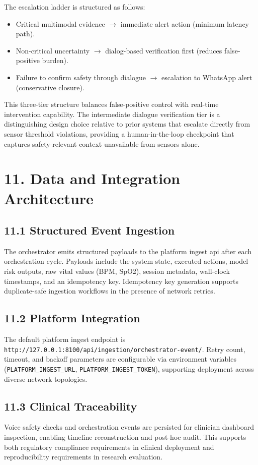 \documentclass[11pt,a4paper]{article}
\begin{document}
The escalation ladder is structured as follows:
\begin{itemize}[leftmargin=1.4em]
  \item Critical multimodal evidence $\rightarrow$ immediate alert action (minimum latency path).
  \item Non-critical uncertainty $\rightarrow$ dialog-based verification first (reduces false-positive burden).
  \item Failure to confirm safety through dialogue $\rightarrow$ escalation to WhatsApp alert (conservative closure).
\end{itemize}
This three-tier structure balances false-positive control with real-time intervention capability. The intermediate dialogue verification tier is a distinguishing design choice relative to prior systems that escalate directly from sensor threshold violations, providing a human-in-the-loop checkpoint that captures safety-relevant context unavailable from sensors alone.

\section{11. Data and Integration Architecture}

\subsection{11.1 Structured Event Ingestion}
The orchestrator emits structured payloads to the platform ingest \gls{api} after each orchestration cycle. Payloads include the system state, executed actions, model risk outputs, raw vital values (BPM, SpO2), session metadata, wall-clock timestamps, and an \gls{idempotency} key. Idempotency key generation supports duplicate-safe ingestion workflows in the presence of network retries.

\subsection{11.2 Platform Integration}
The default platform ingest endpoint is \texttt{http://127.0.0.1:8100/api/ingestion/orchestrator-event/}. Retry count, timeout, and backoff parameters are configurable via environment variables (\texttt{PLATFORM\_INGEST\_URL}, \texttt{PLATFORM\_INGEST\_TOKEN}), supporting deployment across diverse network topologies.

\subsection{11.3 Clinical Traceability}
Voice safety checks and orchestration events are persisted for clinician dashboard inspection, enabling timeline reconstruction and post-hoc audit. This supports both regulatory compliance requirements in clinical deployment and reproducibility requirements in research evaluation.
\end{document}
